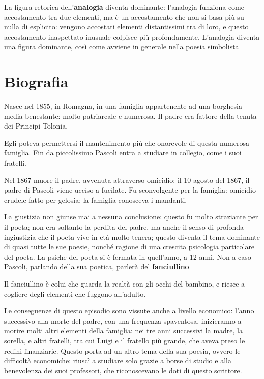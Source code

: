 La figura retorica dell'\textbf{analogia} diventa dominante: l'analogia funziona come accostamento tra due elementi, ma è un accostamento che non si basa più su nulla di esplicito: vengono accostati elementi distantissimi tra di loro, e questo accostamento inaspettato inusuale colpisce più profondamente.
L'analogia diventa una figura dominante, così come avviene in generale nella poesia simbolista


\section{Biografia}

Nasce nel 1855, in Romagna, in una famiglia appartenente ad una borghesia media benestante: molto patriarcale e numerosa. Il padre era fattore della tenuta dei Principi Tolonia.

Egli poteva permettersi il mantenimento più che onorevole di questa numerosa famiglia.
Fin da piccolissimo Pascoli entra a studiare in collegio, come i suoi fratelli.

Nel 1867 muore il padre, avvenuta attraverso omicidio: il 10 agosto del 1867, il padre di Pascoli viene ucciso a fucilate. Fu sconvolgente per la famiglia: omicidio crudele fatto per gelosia; la famiglia conosceva i mandanti.

La giustizia non giunse mai a nessuna conclusione: questo fu molto straziante per il poeta; non era soltanto la perdita del padre, ma anche il senso di profonda ingiustizia che il poeta vive in età molto tenera; questo diventa il tema dominante di quasi tutte le sue poesie, nonché ragione di una crescita psicologia particolare del poeta. La psiche del poeta si è fermata in quell'anno, a 12 anni.
Non a caso Pascoli, parlando della sua poetica, parlerà del \textbf{fanciullino}

Il fanciullino è colui che guarda la realtà con gli occhi del bambino, e riesce a cogliere degli elementi che fuggono all'adulto.

Le conseguenze di questo episodio sono vissute anche a livello economico: l'anno successivo alla morte del padre, con una frequenza spaventosa, inizieranno a morire molti altri elementi della famiglia: nei tre anni successivi la madre, la sorella, e altri fratelli, tra cui Luigi e il fratello più grande, che aveva preso le redini finanziarie.
Questo porta ad un altro tema della sua poesia, ovvero le difficoltà economiche: riuscì a studiare solo grazie a borse di studio e alla benevolenza dei suoi professori, che riconoscevano le doti di questo scrittore.

